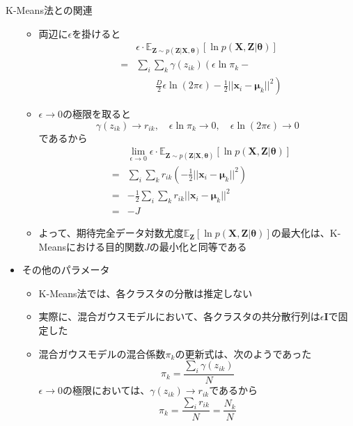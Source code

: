 \documentclass[dvipdfmx,notheorems,t]{beamer}
\begin{document}
\begin{frame}{K-Means法との関連}
\begin{itemize}
\begin{itemize}
		\item 両辺に$\epsilon$を掛けると
		\begin{eqnarray}
			&& \epsilon \cdot \mathbb{E}_{\bm{Z} \sim p(\bm{Z} | \bm{X}, \bm{\theta})} \left[ \ln p(\bm{X}, \bm{Z} | \bm{\theta}) \right] \nonumber \\
			&=& \sum_i \sum_k \gamma(z_{ik}) \left( \epsilon \ln \pi_k - \right. \nonumber \\
			&& \qquad \left. \frac{D}{2} \epsilon \ln (2\pi \epsilon) - \frac{1}{2} || \bm{x}_i - \bm{\mu}_k ||^2 \right)
		\end{eqnarray}
		
		\item $\epsilon \to 0$の極限を取ると
		\begin{equation}
			\gamma(z_{ik}) \to r_{ik}, \quad \epsilon \ln \pi_k \to 0, \quad \epsilon \ln (2\pi \epsilon) \to 0
		\end{equation}
		であるから
		\begin{eqnarray}
			&& \lim_{\epsilon \to 0} \epsilon \cdot \mathbb{E}_{\bm{Z} \sim p(\bm{Z} | \bm{X}, \bm{\theta})} \left[ \ln p(\bm{X}, \bm{Z} | \bm{\theta}) \right] \nonumber \\
			&=& \sum_i \sum_k r_{ik} \left( -\frac{1}{2} || \bm{x}_i - \bm{\mu}_k ||^2 \right) \nonumber \\
			&=& -\frac{1}{2} \sum_i \sum_k r_{ik} || \bm{x}_i - \bm{\mu}_k ||^2 \\
			&=& -J
		\end{eqnarray}
		
		\item よって、期待完全データ対数尤度$\mathbb{E}_{\bm{Z}} \left[ \ln p(\bm{X}, \bm{Z} | \bm{\theta}) \right]$の最大化は、\color{red}K-Meansにおける目的関数$J$の最小化と同等である\normalcolor
		\newline
	\end{itemize}
	
	\framebreak
	
	\item その他のパラメータ
	\begin{itemize}
		\item K-Means法では、各クラスタの分散は推定しない
		\item 実際に、混合ガウスモデルにおいて、各クラスタの共分散行列は$\epsilon \bm{I}$で固定した
		\newline
		\item 混合ガウスモデルの混合係数$\pi_k$の更新式は、次のようであった
		\begin{equation}
			\pi_k = \frac{\sum_i \gamma(z_{ik})}{N}
		\end{equation}
		$\epsilon \to 0$の極限においては、$\gamma(z_{ik}) \to r_{ik}$であるから
		\begin{equation}
			\pi_k = \frac{\sum_i r_{ik}}{N} = \frac{N_k}{N}
		\end{equation}
		

\end{itemize}
\end{itemize}
\end{frame}
\end{document}

